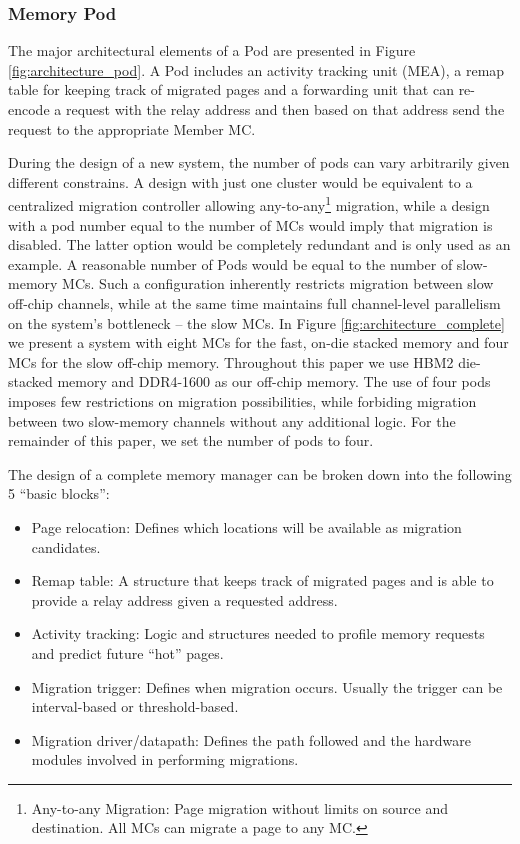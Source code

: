 \subsubsection*{Memory Pod}
The major architectural elements of a Pod are presented in Figure \ref{fig:architecture_pod}. A Pod includes an activity tracking unit (MEA), a remap table for keeping track of migrated pages and a forwarding unit that can re-encode a request with the relay address and then based on that address send the request to the appropriate Member MC.

During the design of a new system, the number of pods can vary arbitrarily given different constrains. A design with just one cluster would be equivalent to a centralized migration controller allowing any-to-any\footnote{Any-to-any Migration: Page migration without limits on source and destination. All MCs can migrate a page to any MC.} migration, while a design with a pod number equal to the number of MCs would imply that migration is disabled. The latter option would be completely redundant and is only used as an example. A reasonable number of Pods would be equal to the number of slow-memory MCs. Such a configuration inherently restricts migration between slow off-chip channels, while at the same time maintains full channel-level parallelism on the system's bottleneck -- the slow MCs. In Figure \ref{fig:architecture_complete} we present a system with eight MCs for the fast, on-die stacked memory and four MCs for the slow off-chip memory. Throughout this paper we use HBM2 die-stacked memory  and DDR4-1600 as our off-chip memory. The use of four pods imposes few restrictions on migration possibilities, while forbiding migration between two slow-memory channels without any additional logic. For the remainder of this paper, we set the number of pods to four.

The design of a complete memory manager can be broken down into the following 5 ``basic blocks'':
\begin{itemize}
\item Page relocation: Defines which locations will be available as migration candidates. 
\item Remap table: A structure that keeps track of migrated pages and is able to provide a relay address given a requested address.
\item Activity tracking: Logic and structures needed to profile memory requests and predict future ``hot'' pages.
\item Migration trigger: Defines when migration occurs. Usually the trigger can be interval-based or threshold-based.
\item Migration driver/datapath: Defines the path followed and the hardware modules involved in performing migrations.
\end{itemize}

